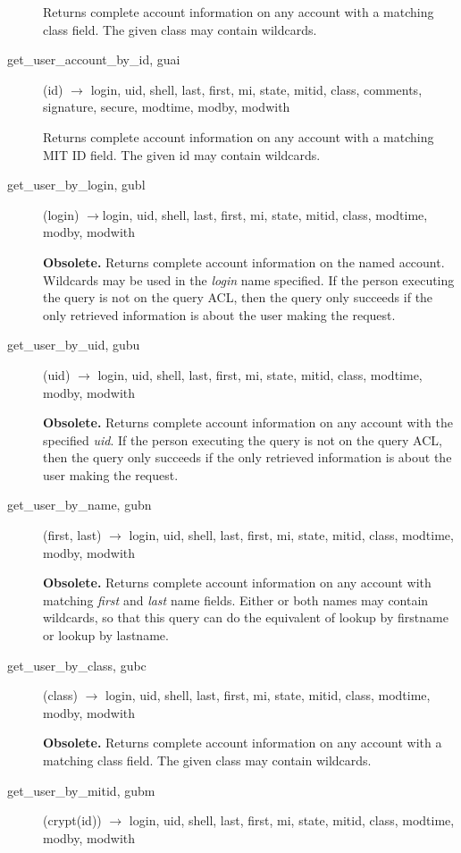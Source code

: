 \documentclass{article}
\begin{document}
\begin{description}
Returns complete account information on any account with a matching
class field.  The given class may contain wildcards.

\item[get\_user\_account\_by\_id, guai](id) $\rightarrow$ login, uid, shell, last, first,
mi, state, mitid, class, comments, signature, secure, modtime, modby, modwith

Returns complete account information on any account with a matching
MIT ID field.  The given id may contain wildcards.

\item[get\_user\_by\_login, gubl](login) $\rightarrow$login, uid, shell,
last, first, mi, state, mitid, class, modtime, modby, modwith

{\bf Obsolete.}  Returns complete account information on the named
account.  Wildcards may be used in the {\em login} name specified.  If
the person executing the query is not on the query ACL, then the query
only succeeds if the only retrieved information is about the user
making the request.

\item[get\_user\_by\_uid, gubu](uid) $\rightarrow$ login, uid, shell, last, first, mi,
state, mitid, class, modtime, modby, modwith

{\bf Obsolete.}  Returns complete account information on any account
with the specified {\em uid}.  If the person executing the query is not
on the query ACL, then the query only succeeds if the only retrieved
information is about the user making the request.

\item[get\_user\_by\_name, gubn](first, last) $\rightarrow$ login, uid, shell,
last, first, mi, state, mitid, class, modtime, modby, modwith

{\bf Obsolete.}  Returns complete account information on any account
with matching {\em first} and {\em last} name fields.  Either or both
names may contain wildcards, so that this query can do the equivalent
of lookup by firstname or lookup by lastname.

\item[get\_user\_by\_class, gubc](class) $\rightarrow$ login, uid, shell, last,
first, mi, state, mitid, class, modtime, modby, modwith

{\bf Obsolete.}  Returns complete account information on any account
with a matching class field.  The given class may contain wildcards.

\item[get\_user\_by\_mitid, gubm](crypt(id)) $\rightarrow$ login, uid, shell, last, first,
mi, state, mitid, class, modtime, modby, modwith


\end{description}
\end{document}
